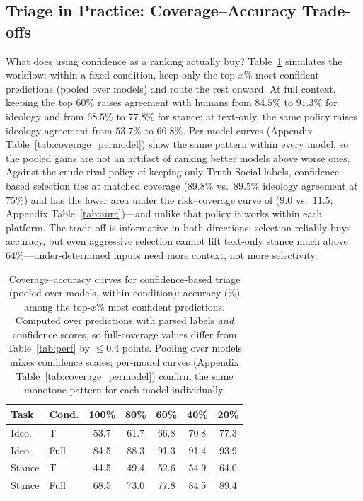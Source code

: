 \documentclass[11pt]{article}
\begin{document}
\subsection{Triage in Practice: Coverage--Accuracy Trade-offs}
\label{sec:results_triage}

What does using confidence as a ranking actually buy? Table~\ref{tab:coverage} simulates the workflow: within a fixed condition, keep only the top $x\%$ most confident predictions (pooled over models) and route the rest onward. At full context, keeping the top $60\%$ raises agreement with humans from $84.5\%$ to $91.3\%$ for ideology and from $68.5\%$ to $77.8\%$ for stance; at text-only, the same policy raises ideology agreement from $53.7\%$ to $66.8\%$. Per-model curves (Appendix Table~\ref{tab:coverage_permodel}) show the same pattern within every model, so the pooled gains are not an artifact of ranking better models above worse ones. Against the crude rival policy of keeping only Truth Social labels, confidence-based selection ties at matched coverage ($89.8\%$ vs.\ $89.5\%$ ideology agreement at $75\%$) and has the lower area under the risk--coverage curve of \citet{elyaniv_foundations_2010} ($9.0$ vs.\ $11.5$; Appendix Table~\ref{tab:aurc})---and unlike that policy it works within each platform. The trade-off is informative in both directions: selection reliably buys accuracy, but even aggressive selection cannot lift text-only stance much above $64\%$---under-determined inputs need more context, not more selectivity.

\begin{table}[t]
\centering
\small
\setlength{\tabcolsep}{4.5pt}
\begin{tabular}{llccccc}
\toprule
Task & Cond. & 100\% & 80\% & 60\% & 40\% & 20\% \\
\midrule
Ideo. & T        & 53.7 & 61.7 & 66.8 & 70.8 & 77.3 \\
Ideo. & Full     & 84.5 & 88.3 & 91.3 & 91.4 & 93.9 \\
Stance & T       & 44.5 & 49.4 & 52.6 & 54.9 & 64.0 \\
Stance & Full    & 68.5 & 73.0 & 77.8 & 84.5 & 89.4 \\
\bottomrule
\end{tabular}
\caption{Coverage--accuracy curves for confidence-based triage (pooled over models, within condition): accuracy (\%) among the top-$x\%$ most confident predictions. Computed over predictions with parsed labels \emph{and} confidence scores, so full-coverage values differ from Table~\ref{tab:perf} by $\le$0.4 points. Pooling over models mixes confidence scales; per-model curves (Appendix Table~\ref{tab:coverage_permodel}) confirm the same monotone pattern for each model individually.}
\label{tab:coverage}
\end{table}
\end{document}
